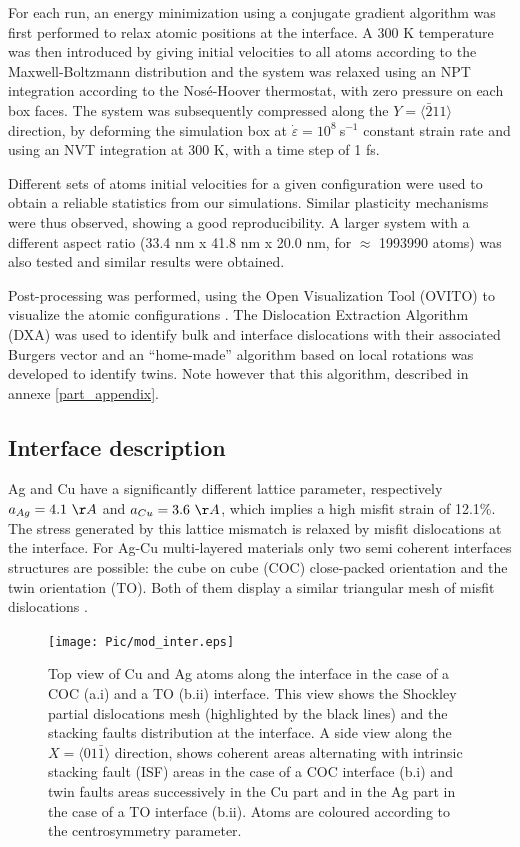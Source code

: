 \documentclass[final,3p,times,twocolumn]{elsarticle}
\begin{document}
For each run, an energy minimization using a conjugate gradient algorithm was first performed to relax atomic positions at the interface. A 300 K temperature was then introduced by giving initial velocities to all atoms according to the Maxwell-Boltzmann distribution and the system was relaxed using an NPT integration according to the Nosé-Hoover thermostat, with zero pressure on each box faces. The system was subsequently compressed along the $Y=\langle\bar{2}11\rangle$ direction, by deforming the simulation box at $\dot{\varepsilon}=10^{8}~$s$^{-1}$ constant strain rate and using an NVT integration at 300 K, with a time step of 1 fs.

Different sets of atoms initial velocities for a given configuration were used to obtain a reliable statistics from our simulations. Similar plasticity mechanisms were thus observed, showing a good reproducibility. A larger system with a different aspect ratio (33.4 nm x 41.8 nm x 20.0 nm, for $\approx$ 1993990 atoms) was also tested and similar results were obtained. 

Post-processing was performed, using the Open Visualization Tool (OVITO) to visualize the atomic configurations \cite{stukowski10MSMSE1}. The Dislocation Extraction Algorithm (DXA) was used to identify bulk and interface dislocations with their associated Burgers vector and an ``home-made'' algorithm based on local rotations was developed to identify twins. Note however that this algorithm, described in annexe \ref{part_appendix}.

	\subsection{Interface description}
	\label{subpart_interface}

Ag and Cu have a significantly different lattice parameter, respectively $a_{Ag}=4.1~\AA$ and $a_{Cu}=3.6~\AA$, which implies a high misfit strain of 12.1\%. The stress generated by this lattice mismatch is relaxed by misfit dislocations at the interface. For Ag-Cu multi-layered materials only two semi coherent interfaces structures are possible: the cube on cube (COC) close-packed orientation and the twin orientation (TO). Both of them display a similar triangular mesh of misfit dislocations \cite{wang11SM,an15APL}.

\begin{figure}[!h]
	\begin{center}
		\texttt{[image: Pic/mod\_inter.eps]} 
	\end{center}
	\caption{Top view of Cu and Ag atoms along the interface in the case of a COC (a.i) and a TO (b.ii) interface. This view shows the Shockley partial dislocations mesh (highlighted by the black lines) and the stacking faults distribution at the interface. A side view along the $X=\langle01\bar{1}\rangle$ direction, shows coherent areas alternating with intrinsic stacking fault (ISF) areas in the case of a COC interface (b.i) and twin faults areas successively in the Cu part and in the Ag part in the case of a TO interface (b.ii). Atoms are coloured according to the centrosymmetry parameter.}\label{fig_mod_inter}
\end{figure}
\end{document}
